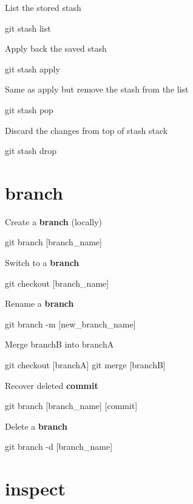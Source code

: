 \documentclass{refcard}
\begin{document}
List the stored stash
\begin{ttyenv}
git stash list
\end{ttyenv}

Apply back the saved stash
\begin{ttyenv}
git stash apply
\end{ttyenv}

Same as apply but remove the stash from the list
\begin{ttyenv}
git stash pop
\end{ttyenv}

Discard the changes from top of stash stack
\begin{ttyenv}
git stash drop
\end{ttyenv}

\section{branch}

Create a \textbf{branch} (locally)
\begin{ttyenv}
git branch [branch_name]
\end{ttyenv}

Switch to a \textbf{branch}
\begin{ttyenv}
git checkout [branch_name]
\end{ttyenv}

Rename a \textbf{branch}
\begin{ttyenv}
git branch -m [new_branch_name]
\end{ttyenv}

Merge branchB into branchA 
\begin{ttyenv}
git checkout [branchA]
git merge [branchB]
\end{ttyenv}

Recover deleted \textbf{commit}
\begin{ttyenv}
git branch [branch_name] [commit]
\end{ttyenv}

Delete a \textbf{branch}
\begin{ttyenv}
git branch -d [branch_name]
\end{ttyenv}

\section{inspect}
\end{document}
